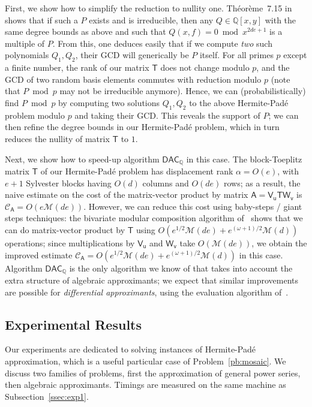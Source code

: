 \documentclass[sigconf]{acmart}
\newcommand{\vu}{\ensuremath{\mathsf{u}}}
\newcommand{\vv}{\ensuremath{\mathsf{v}}}
\newcommand{\mA}{\ensuremath{\mathsf{A}}}
\newcommand{\mT}{\ensuremath{\mathsf{T}}}
\newcommand{\mV}{\ensuremath{\mathsf{V}}}
\newcommand{\mW}{\ensuremath{\mathsf{W}}}
\newcommand{\Q}{\ensuremath{\mathbb{Q}}}
\newcommand{\M}{\ensuremath{\mathscr{M}}}
\newcommand{\CA}{\ensuremath{\mathscr{C}_\mA}}
\newcommand{\DACQ}{\ensuremath{\mathsf{DAC}_\Q}}
\theoremstyle{acmdefinition}
\begin{document}
First, we show how to simplify the reduction to nullity one.
Th\'eo\-r\`eme~7.15 in~\cite{BoChGiLeLeSaSc17} shows that if such a
$P$ exists and is irreducible, then any $Q \in \Q[x,y]$ with the same
degree bounds as above and such that $Q(x,f) = 0 \bmod x^{2de+1}$ is a
multiple of $P$.  From this, one deduces easily that if we compute
\emph{two} such polynomials $Q_1,Q_2$, their GCD will generically be
$P$ itself. For all primes $p$ except a finite number, the rank of our
matrix $\mT$ does not change modulo $p$, and the GCD of two random
basis elements commutes with reduction modulo $p$ (note that $P \bmod
p$ may not be irreducible anymore). Hence, we can (probabilistically)
find $P \bmod p$ by computing two solutions $Q_1,Q_2$ to the above
Hermite-Pad\'e problem modulo $p$ and taking their GCD. This reveals
the support of $P$; we can then refine the degree bounds in our
Hermite-Pad\'e problem, which in turn reduces the nullity of matrix
$\mT$ to $1$.

Next, we show how to speed-up algorithm $\DACQ$ in this case. The
block-Toeplitz matrix $\mT$ of our Hermite-Pad\'e problem has
displacement rank $\alpha = O(e)$, with $e+1$ Sylvester blocks having
$O(d)$ columns and $O(de)$ rows; as a result, the naive estimate on
the cost of the matrix-vector product by matrix $\mA = \mV_\vu \mT
\mW_\vv$ is $\CA=O(e \M(de))$. However, we can reduce this cost using
baby-steps / giant steps techniques: the bivariate modular composition
algorithm of~\cite{NuZi04} shows that we can do matrix-vector product
by $\mT$ using $O(e^{1/2} \M(de) + e^{(\omega+1)/2} \M(d))$
operations; since multiplications by $\mV_\vu$ and $\mW_\vv$ take
$O(\M(de))$, we obtain the improved estimate $\CA=O(e^{1/2} \M(de) +
e^{(\omega+1)/2} \M(d))$ in this case. Algorithm $\DACQ$ is the only
algorithm we know of that takes into account the extra structure of
algebraic approximants; we expect that similar improvements are
possible for {\em differential approximants}, using the evaluation
algorithm of~\cite{BoSc09}.

\vspace{-5px}
\subsection{Experimental Results}

Our experiments are dedicated to solving instances of Hermite-Pad\'e
approximation, which is a useful particular case of
Problem~\ref{pb:mosaic}. We discuss two families of problems, first
the approximation of general power series, then algebraic
approximants. Timings are measured on the same machine as
Subsection~\ref{ssec:exp1}.
\end{document}
